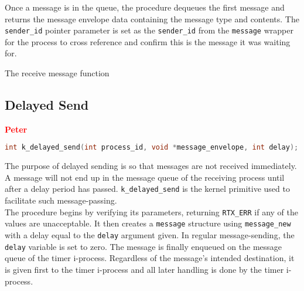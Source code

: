 \documentclass[12pt]{report}
\begin{document}
Once a message is in the queue, the procedure dequeues the first message and returns the message envelope data containing the message type and contents. The {\tt sender\_id} pointer parameter is set as the {\tt sender\_id} from the {\tt message} wrapper for the process to cross reference and confirm this is the message it was waiting for. \\

\begin{algorithm}
  \caption{The receive message function}
  \begin{algorithmic}[1]
		\EndWhile
    \EndProcedure
  \end{algorithmic}
\end{algorithm}

\subsection{Delayed Send}

\textcolor{red}{\textbf{Peter}} \\

\begin{minipage}{\textwidth}
\begin{lstlisting}[language=C, frame=single]
int k_delayed_send(int process_id, void *message_envelope, int delay);
\end{lstlisting}
\end{minipage}

The purpose of delayed sending is so that messages are not received immediately. A message will not end up in the message queue of the receiving process until after a delay period has passed. {\tt k\_delayed\_send} is the kernel primitive used to facilitate such message-passing.\\

The procedure begins by verifying its parameters, returning {\tt RTX_ERR} if any of the values are unacceptable. It then creates a {\tt message} structure using {\tt message\_new} with a delay equal to the {\tt delay} argument given. In regular message-sending, the {\tt delay} variable is set to zero. The message is finally enqueued on the message queue of the timer i-process. Regardless of the message's intended destination, it is given first to the timer i-process and all later handling is done by the timer i-process.\\
\end{document}
